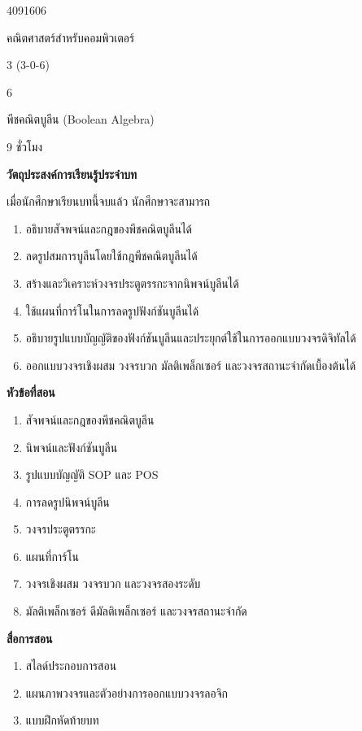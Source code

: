 
\begin{description}[leftmargin=2cm, style=nextline, itemsep=0.1em, parsep=0pt]
    \item[รหัสวิชา] 4091606
    \item[ชื่อวิชา] คณิตศาสตร์สำหรับคอมพิวเตอร์
    \item[หน่วยกิต] 3 (3-0-6)
    \item[บทที่] 6
    \item[ชื่อบท] พีชคณิตบูลีน (Boolean Algebra)
    \item[จำนวนชั่วโมง] 9 ชั่วโมง
\end{description}

\noindent \textbf{\large วัตถุประสงค์การเรียนรู้ประจำบท}\par\vspace{0.2em}\noindent
\noindent เมื่อนักศึกษาเรียนบทนี้จบแล้ว นักศึกษาจะสามารถ
\begin{enumerate}[topsep=0.2em, itemsep=0.15em, leftmargin=*]
    \item อธิบายสัจพจน์และกฎของพีชคณิตบูลีนได้
    \item ลดรูปสมการบูลีนโดยใช้กฎพีชคณิตบูลีนได้
    \item สร้างและวิเคราะห์วงจรประตูตรรกะจากนิพจน์บูลีนได้
    \item ใช้แผนที่การ์โนในการลดรูปฟังก์ชันบูลีนได้
    \item อธิบายรูปแบบบัญญัติของฟังก์ชันบูลีนและประยุกต์ใช้ในการออกแบบวงจรดิจิทัลได้
    \item ออกแบบวงจรเชิงผสม วงจรบวก มัลติเพล็กเซอร์ และวงจรสถานะจำกัดเบื้องต้นได้
\end{enumerate}

\noindent \textbf{\large หัวข้อที่สอน}\par\vspace{0.2em}\noindent
\begin{enumerate}[topsep=0.2em, itemsep=0.15em, leftmargin=*]
    \item สัจพจน์และกฎของพีชคณิตบูลีน
    \item นิพจน์และฟังก์ชันบูลีน
    \item รูปแบบบัญญัติ SOP และ POS
    \item การลดรูปนิพจน์บูลีน
    \item วงจรประตูตรรกะ
    \item แผนที่การ์โน
    \item วงจรเชิงผสม วงจรบวก และวงจรสองระดับ
    \item มัลติเพล็กเซอร์ ดีมัลติเพล็กเซอร์ และวงจรสถานะจำกัด
\end{enumerate}

\noindent \textbf{\large สื่อการสอน}
\begin{enumerate}[topsep=0.2em, itemsep=0.15em, leftmargin=*]
    \item สไลด์ประกอบการสอน
    \item แผนภาพวงจรและตัวอย่างการออกแบบวงจรลอจิก
    \item แบบฝึกหัดท้ายบท
\end{enumerate}
